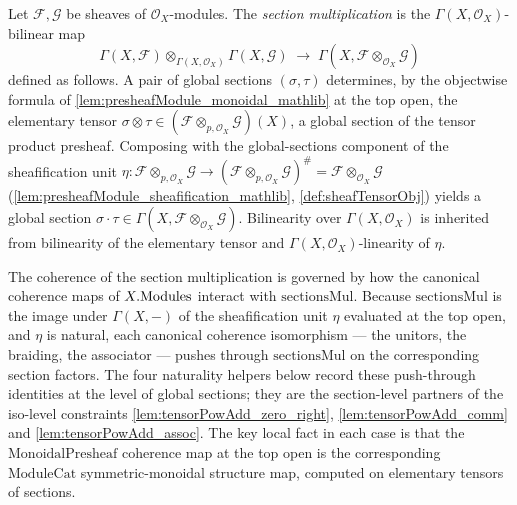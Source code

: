 \begin{definition}
  \label{def:sectionMul}
  Let \(\mathcal{F}, \mathcal{G}\) be sheaves of \(\mathcal{O}_X\)-modules. The
  \emph{section multiplication} is the \(\Gamma(X,\mathcal{O}_X)\)-bilinear map
  \[
    \Gamma(X, \mathcal{F}) \otimes_{\Gamma(X,\mathcal{O}_X)}
      \Gamma(X, \mathcal{G})
    \;\longrightarrow\;
    \Gamma(X, \mathcal{F} \otimes_{\mathcal{O}_X} \mathcal{G})
  \]
  defined as follows. A pair of global sections \((\sigma, \tau)\) determines,
  by the objectwise formula of \cref{lem:presheafModule_monoidal_mathlib} at the
  top open, the elementary tensor \(\sigma \otimes \tau \in
  (\mathcal{F} \otimes_{p,\mathcal{O}_X} \mathcal{G})(X)\), a global section of
  the tensor product presheaf. Composing with the global-sections component of
  the sheafification unit
  \(\eta : \mathcal{F} \otimes_{p,\mathcal{O}_X} \mathcal{G} \to
  (\mathcal{F} \otimes_{p,\mathcal{O}_X} \mathcal{G})^{\#} =
  \mathcal{F} \otimes_{\mathcal{O}_X} \mathcal{G}\)
  (\cref{lem:presheafModule_sheafification_mathlib},
  \cref{def:sheafTensorObj}) yields a global section
  \(\sigma \cdot \tau \in
  \Gamma(X, \mathcal{F} \otimes_{\mathcal{O}_X} \mathcal{G})\). Bilinearity over
  \(\Gamma(X,\mathcal{O}_X)\) is inherited from bilinearity of the elementary
  tensor and \(\Gamma(X,\mathcal{O}_X)\)-linearity of \(\eta\).
\end{definition}

The coherence of the section multiplication is governed by how the canonical
coherence maps of \(X.\mathrm{Modules}\) interact with \(\mathrm{sectionsMul}\). Because
\(\mathrm{sectionsMul}\) is the image under \(\Gamma(X,-)\) of the sheafification
unit \(\eta\) evaluated at the top open, and \(\eta\) is natural, each canonical
coherence isomorphism --- the unitors, the braiding, the associator --- pushes
through \(\mathrm{sectionsMul}\) on the corresponding section factors. The four
naturality helpers below record these push-through identities at the level of
global sections; they are the section-level partners of the iso-level constraints
\cref{lem:tensorPowAdd_zero_right}, \cref{lem:tensorPowAdd_comm} and
\cref{lem:tensorPowAdd_assoc}. The key local fact in each case is that the
\(\mathrm{MonoidalPresheaf}\) coherence map at the top open is the corresponding
\(\mathrm{ModuleCat}\) symmetric-monoidal structure map, computed on elementary
tensors of sections.

